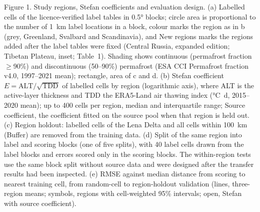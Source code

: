 \noindent Figure 1. Study regions, Stefan coefficients and evaluation design.
(a) Labelled cells of the licence-verified label tables in 0.5° blocks; circle area is proportional to the number of 1~km label locations in a block, colour marks the region as in b (grey, Greenland, Svalbard and Scandinavia), and New regions marks the regions added after the label tables were fixed (Central Russia, expanded edition; Tibetan Plateau, inset; Table~1).
Shading shows continuous (permafrost fraction $\geq$90\%) and discontinuous (50--90\%) permafrost (ESA CCI Permafrost fraction v4.0, 1997--2021 mean); rectangle, area of c and d.
(b) Stefan coefficient $E = \mathrm{ALT}/\sqrt{\mathrm{TDD}}$ of labelled cells by region (logarithmic axis), where ALT is the active-layer thickness and TDD the ERA5-Land\cite{munozsabater2021_era5_land} air thawing index (°C~d, 2015--2020 mean); up to 400 cells per region, median and interquartile range; Source coefficient, the coefficient fitted on the source pool when that region is held out.
(c) Region holdout: labelled cells of the Lena Delta and all cells within 100~km (Buffer) are removed from the training data.
(d) Split of the same region into label and scoring blocks (one of five splits), with 40 label cells drawn from the label blocks and errors scored only in the scoring blocks.
The within-region tests use the same block split without source data and were designed after the transfer results had been inspected.
(e) RMSE against median distance from scoring to nearest training cell, from random-cell to region-holdout validation (lines, three-region means; symbols, regions with cell-weighted 95\% intervals; open, Stefan with source coefficient).
